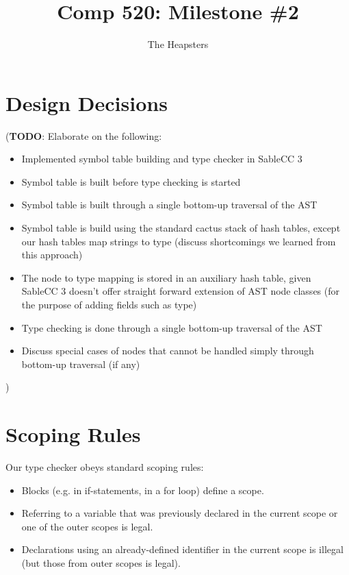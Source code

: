 \documentclass{article}
\title{Comp 520: Milestone \#2}
\author{The Heapsters}
\date{}
\begin{document}
\maketitle

\section*{Design Decisions}

(\textbf{TODO}: Elaborate on the following:

\begin{itemize}
\item Implemented symbol table building and type checker in SableCC 3
\item Symbol table is built before type checking is started
\item Symbol table is built through a single bottom-up traversal of the AST
\item Symbol table is build using the standard cactus stack of hash tables, except our hash tables map strings to type (discuss shortcomings we learned from this approach)
\item The node to type mapping is stored in an auxiliary hash table, given SableCC 3 doesn't offer straight forward extension of AST node classes (for the purpose of adding fields such as type)
\item Type checking is done through a single bottom-up traversal of the AST
\item Discuss special cases of nodes that cannot be handled simply through bottom-up traversal (if any)
\end{itemize}
)

\section*{Scoping Rules}

Our type checker obeys standard scoping rules:

\begin{itemize}
    \item Blocks (e.g. in if-statements, in a for loop) define a scope.
    \item Referring to a variable that was previously declared in the current scope or one of the outer scopes is legal.
    \item Declarations using an already-defined identifier in the current scope is illegal (but those from outer scopes is legal).
\end{itemize}
\end{document}
